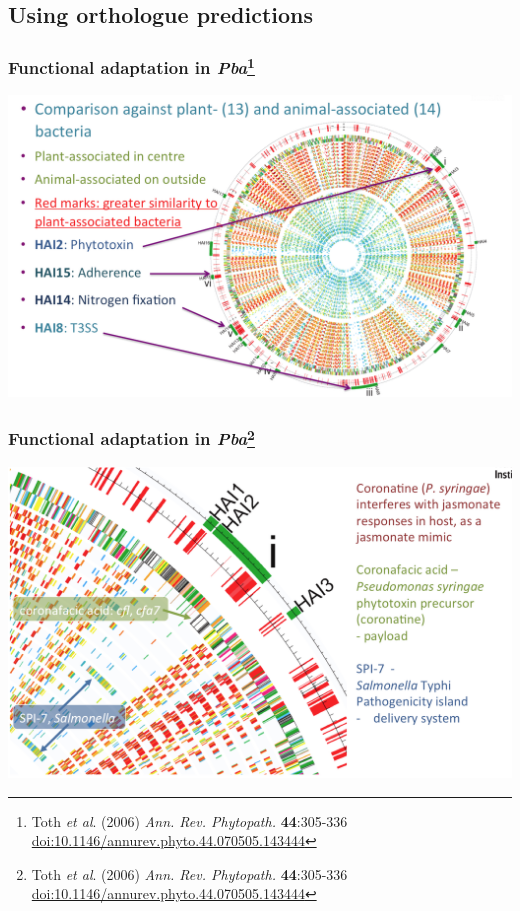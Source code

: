 
\subsection{Using orthologue predictions}

\begin{frame}
  \frametitle{Functional adaptation in \textit{Pba}\footnote{\tiny{Toth \textit{et al}. (2006) \textit{Ann. Rev. Phytopath.} \textbf{44}:305-336 \href{http://dx.doi.org/10.1146/annurev.phyto.44.070505.143444}{doi:10.1146/annurev.phyto.44.070505.143444}}}}
  \begin{center}
      \includegraphics[width=1\textwidth]{images/pba_lgt} 
  \end{center}
\end{frame}

\begin{frame}
  \frametitle{Functional adaptation in \textit{Pba}\footnote{\tiny{Toth \textit{et al}. (2006) \textit{Ann. Rev. Phytopath.} \textbf{44}:305-336 \href{http://dx.doi.org/10.1146/annurev.phyto.44.070505.143444}{doi:10.1146/annurev.phyto.44.070505.143444}}}}
  \begin{center}
      \includegraphics[width=1\textwidth]{images/pba_coronatine} 
  \end{center}
\end{frame}

